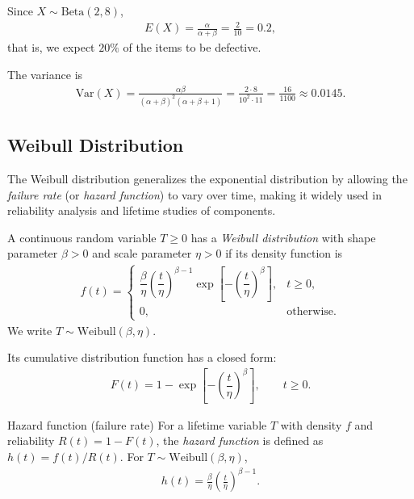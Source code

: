 \begin{solucion}
Since $X \sim \text{Beta}(2,8)$,
\begin{align}
 E(X) = \frac{\alpha}{\alpha+\beta} = \frac{2}{10} = 0.2,
\end{align}
that is, we expect $20\%$ of the items to be defective.

The variance is
\begin{align}
 \text{Var}(X) = \frac{\alpha\beta}{(\alpha+\beta)^2(\alpha+\beta+1)}
 = \frac{2\cdot 8}{10^2 \cdot 11} = \frac{16}{1100} \approx 0.0145.
\end{align}
\end{solucion}

\subsection{Weibull Distribution}

The Weibull distribution generalizes the exponential distribution by allowing the
\emph{failure rate} (or \emph{hazard function}) to vary over time, making it widely used
in reliability analysis and lifetime studies of components.

\begin{definicion}
A continuous random variable $T \geq 0$ has a \emph{Weibull distribution} with shape
parameter $\beta > 0$ and scale parameter $\eta > 0$ if its density function is
\begin{align}
 \label{eq:2.8.18}
 f(t) =
 \begin{cases}
  \dfrac{\beta}{\eta}\left(\dfrac{t}{\eta}\right)^{\beta-1}
  \exp\!\left[-\left(\dfrac{t}{\eta}\right)^{\beta}\right], & t \geq 0, \\
  0, & \text{otherwise.}
 \end{cases}
\end{align}
We write $T \sim \text{Weibull}(\beta,\eta)$.
\end{definicion}

Its cumulative distribution function has a closed form:
\begin{align}
 \label{eq:2.8.19}
 F(t) = 1 - \exp\!\left[-\left(\dfrac{t}{\eta}\right)^{\beta}\right], \qquad t \geq 0.
\end{align}

{Hazard function (failure rate)} For a lifetime variable $T$ with density $f$ and
reliability $R(t) = 1 - F(t)$, the \emph{hazard function} is defined as $h(t) =
f(t)/R(t)$. For $T \sim \text{Weibull}(\beta,\eta)$,
\begin{align}
 \label{eq:2.8.20}
 h(t) = \frac{\beta}{\eta}\left(\frac{t}{\eta}\right)^{\beta-1}.
\end{align}

